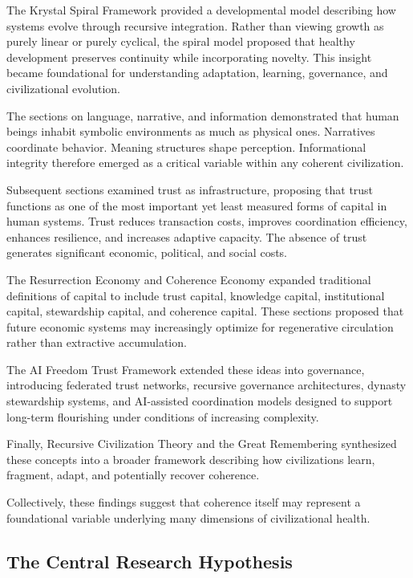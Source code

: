 \documentclass[12pt]{article}
\begin{document}
The Krystal Spiral Framework provided a developmental model describing how systems evolve through recursive integration. Rather than viewing growth as purely linear or purely cyclical, the spiral model proposed that healthy development preserves continuity while incorporating novelty. This insight became foundational for understanding adaptation, learning, governance, and civilizational evolution.

The sections on language, narrative, and information demonstrated that human beings inhabit symbolic environments as much as physical ones. Narratives coordinate behavior. Meaning structures shape perception. Informational integrity therefore emerged as a critical variable within any coherent civilization.

Subsequent sections examined trust as infrastructure, proposing that trust functions as one of the most important yet least measured forms of capital in human systems. Trust reduces transaction costs, improves coordination efficiency, enhances resilience, and increases adaptive capacity. The absence of trust generates significant economic, political, and social costs.

The Resurrection Economy and Coherence Economy expanded traditional definitions of capital to include trust capital, knowledge capital, institutional capital, stewardship capital, and coherence capital. These sections proposed that future economic systems may increasingly optimize for regenerative circulation rather than extractive accumulation.

The AI Freedom Trust Framework extended these ideas into governance, introducing federated trust networks, recursive governance architectures, dynasty stewardship systems, and AI-assisted coordination models designed to support long-term flourishing under conditions of increasing complexity.

Finally, Recursive Civilization Theory and the Great Remembering synthesized these concepts into a broader framework describing how civilizations learn, fragment, adapt, and potentially recover coherence.

Collectively, these findings suggest that coherence itself may represent a foundational variable underlying many dimensions of civilizational health.

\subsection{The Central Research Hypothesis}
\end{document}

